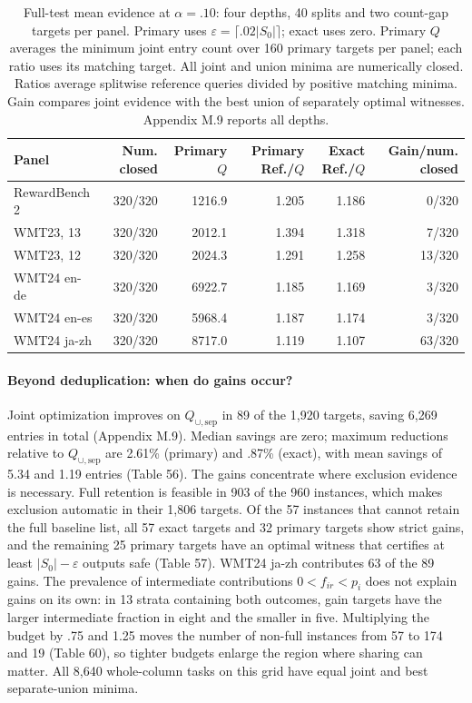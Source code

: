 \documentclass[11pt]{article}
\newcommand{\Qu}{Q_{\cup,\mathrm{sep}}}
\newcommand{\Sz}{S_0}
\begin{document}
\begin{table}[t]
\centering\small
\begin{tabular}{@{}lrrrrr@{}}
\toprule
Panel & Num. closed & Primary $Q$ & Primary Ref./$Q$ & Exact Ref./$Q$ & Gain/num. closed\\
\midrule
RewardBench 2 & 320/320 & 1216.9 & 1.205 & 1.186 & 0/320\\
WMT23, 13 & 320/320 & 2012.1 & 1.394 & 1.318 & 7/320\\
WMT23, 12 & 320/320 & 2024.3 & 1.291 & 1.258 & 13/320\\
WMT24 en-de & 320/320 & 6922.7 & 1.185 & 1.169 & 3/320\\
WMT24 en-es & 320/320 & 5968.4 & 1.187 & 1.174 & 3/320\\
WMT24 ja-zh & 320/320 & 8717.0 & 1.119 & 1.107 & 63/320\\
\bottomrule
\end{tabular}
\caption{Full-test mean evidence at $\alpha=.10$: four depths, 40 splits and two count-gap targets per panel. Primary uses $\varepsilon=\lceil.02|\Sz|\rceil$; exact uses zero. Primary $Q$ averages the minimum joint entry count over 160 primary targets per panel; each ratio uses its matching target. All joint and union minima are numerically closed. Ratios average splitwise reference queries divided by positive matching minima. Gain compares joint evidence with the best union of separately optimal witnesses. Appendix M.9 reports all depths.}
\label{tab:full}
\end{table}

\paragraph{Beyond deduplication: when do gains occur?} Joint optimization improves on $\Qu$ in 89 of the 1,920 targets, saving 6,269 entries in total (Appendix M.9). Median savings are zero; maximum reductions relative to $\Qu$ are 2.61\% (primary) and .87\% (exact), with mean savings of 5.34 and 1.19 entries (Table 56). The gains concentrate where exclusion evidence is necessary. Full retention is feasible in 903 of the 960 instances, which makes exclusion automatic in their 1,806 targets. Of the 57 instances that cannot retain the full baseline list, all 57 exact targets and 32 primary targets show strict gains, and the remaining 25 primary targets have an optimal witness that certifies at least $|\Sz|-\varepsilon$ outputs safe (Table 57). WMT24 ja-zh contributes 63 of the 89 gains. The prevalence of intermediate contributions $0<f_{ir}<p_i$ does not explain gains on its own: in 13 strata containing both outcomes, gain targets have the larger intermediate fraction in eight and the smaller in five. Multiplying the budget by .75 and 1.25 moves the number of non-full instances from 57 to 174 and 19 (Table 60), so tighter budgets enlarge the region where sharing can matter. All 8,640 whole-column tasks on this grid have equal joint and best separate-union minima.
\end{document}

